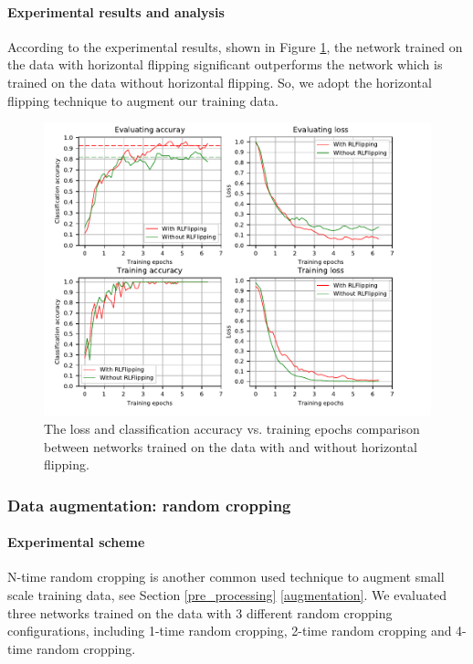\paragraph{Experimental results and analysis}
According to the experimental results, shown in Figure \ref{fig:plot_rlf}, the network trained on the data with horizontal flipping significant outperforms the network which is trained on the data without horizontal flipping. So, we adopt the horizontal flipping technique to augment our training data. 
\begin{figure}
	\includegraphics[trim=0cm 0cm 0cm 0cm]{fig01/plot_rlf.pdf}
	\caption{The loss and classification accuracy vs. training epochs comparison between networks trained on the data with and without horizontal flipping.}
	\label{fig:plot_rlf}
\end{figure}


\subsubsection{Data augmentation: random cropping}
\paragraph{Experimental scheme}
N-time random cropping is another common used technique to augment small scale training data, see Section \ref{pre_processing} \ref{augmentation}. We evaluated three networks trained on the data with 3 different random cropping configurations, including 1-time random cropping, 2-time random cropping and 4-time random cropping. 


